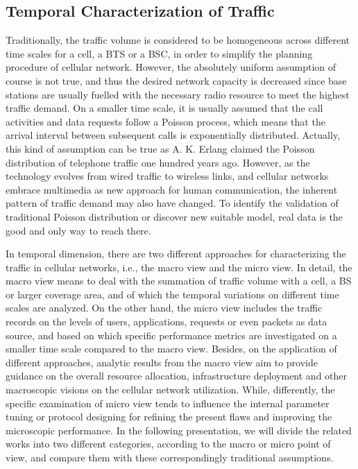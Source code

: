{\subsection{Temporal Characterization of Traffic}
Traditionally, the traffic volume is considered to be homogeneous across different time scales for a cell, a BTS or a BSC, in order to simplify the planning procedure of cellular network. However, the absolutely uniform assumption of course is not true, and thus the desired network capacity is decreased since base stations are usually fuelled with the necessary radio resource to meet the highest traffic demand. On a smaller time scale, it is usually assumed that the call activities and data requests follow a Poisson process, which means that the arrival interval between subsequent calls is exponentially distributed. Actually, this kind of assumption can be true as A. K. Erlang claimed the Poisson distribution of telephone traffic one hundred years ago. However, as the technology evolves from wired traffic to wireless links, and cellular networks embrace multimedia as new approach for human communication, the inherent pattern of traffic demand may also have changed. To identify the validation of traditional Poisson distribution or discover new suitable model, real data is the good and only way to reach there.

In temporal dimension, there are two different approaches for characterizing the traffic in cellular networks, i.e., the macro view and the micro view. In detail, the macro view means to deal with the summation of traffic volume with a cell, a BS or larger coverage area, and of which the temporal variations on different time scales are analyzed. On the other hand, the micro view includes the traffic records on the levels of users, applications, requests or even packets as data source, and based on which specific performance metrics are investigated on a smaller time scale compared to the macro view. Besides, on the application of different approaches, analytic results from the macro view aim to provide guidance on the overall resource allocation, infrastructure deployment and other macroscopic visions on the cellular network utilization. While, differently, the specific examination of micro view tends to influence the internal parameter tuning or protocol designing for refining the present flaws and improving the microscopic performance. In the following presentation, we will divide the related works into two different categories, according to the macro or micro point of view, and compare them with these correspondingly traditional assumptions.

}
